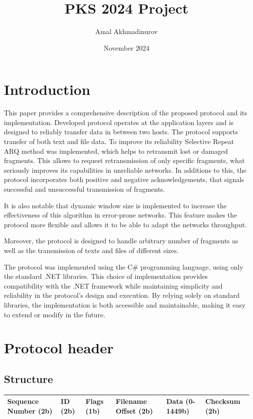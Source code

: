 \documentclass{article}
\title{PKS 2024 Project}
\author{Amal Akhmadinurov}
\date{November 2024}
\begin{document}
\maketitle
\tableofcontents
\newpage
\section{Introduction}


This paper provides a comprehensive description of the proposed protocol and its implementation.
Developed protocol operates at the application layers and is designed to reliably transfer data in between two hosts. The protocol supports transfer of both text and file data. To improve its reliability Selective Repeat ARQ method was implemented, which helps to retransmit lost or damaged fragments. This allows to request retransmission of only specific fragments, what seriously improves its capabilities in unreliable networks. In additions to this, the protocol incorporates both positive and negative acknowledgements, that signals successful and unsuccessful transmission of fragments. 

It is also notable that dynamic window size is implemented to increase the effectiveness of this algorithm in error-prone networks. This feature makes the protocol more flexible and allows it to be able to adapt the networks throughput.

Moreover, the protocol is designed to handle arbitrary number of fragments as well as the transmission of texts and files of different sizes.

The protocol was implemented using the C\# programming language, using only the standard .NET libraries. This choice of implementation provides compatibility with the .NET framework while maintaining simplicity and reliability in the protocol's design and execution. By relying solely on standard libraries, the implementation is both accessible and maintainable, making it easy to extend or modify in the future.



\newpage
\section{Protocol header}

\subsection{Structure}

\begin{tabular}{|p{2cm}|p{1cm}|p{1cm}|p{2cm}|p{3cm}|p{2cm}|}
\hline
Sequence Number (2b) & 
ID (2b) & 
Flags  (1b)& 
Filename Offset (2b) &
Data (0-1449b) &
Checksum (2b)

\\
\hline




\end{tabular}
\newline
\newline
\end{document}
